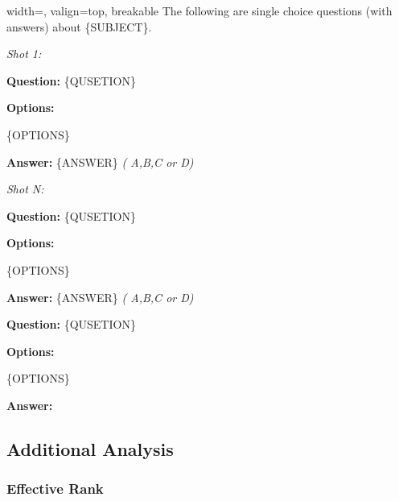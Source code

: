\begin{bluebox}{width=\linewidth, valign=top, breakable}
The following are single choice questions (with answers) about {\ttfamily\small
\{{{SUBJECT}}\}}.

\vspace{1.2em}
{\footnotesize\itshape
Shot 1:
}

\medskip
\noindent\textbf{Question:}
{\ttfamily\small
\{{{QUSETION}}\}}
\vspace{0.8em}

\medskip
\noindent\textbf{Options:}

{\ttfamily\small
\{{{OPTIONS}}\}}
\vspace{0.8em}

\medskip
\noindent\textbf{Answer:} {\ttfamily\small
\{{{ANSWER}}\}} {\footnotesize\itshape(
A,B,C or D)
}

\centerline{\textellipsis}

{\footnotesize\itshape
Shot N:
}

\medskip
\noindent\textbf{Question:}
{\ttfamily\small
\{{{QUSETION}}\}}
\vspace{0.8em}

\medskip
\noindent\textbf{Options:}

{\ttfamily\small
\{{{OPTIONS}}\}}
\vspace{0.8em}

\medskip
\noindent\textbf{Answer:} {\ttfamily\small
\{{{ANSWER}}\}} {\footnotesize\itshape(
A,B,C or D)
}

\vspace{1.5em}

\medskip
\noindent\textbf{Question:}
{\ttfamily\small
\{{{QUSETION}}\}}
\vspace{0.8em}

\medskip
\noindent\textbf{Options:}

{\ttfamily\small
\{{{OPTIONS}}\}}
\vspace{0.8em}

\medskip
\noindent\textbf{Answer:}

\vspace{1em}

\end{bluebox}


\subsection{Additional Analysis}
\subsubsection{Effective Rank}
\label{sec:appendix/setup/effective_rank}

